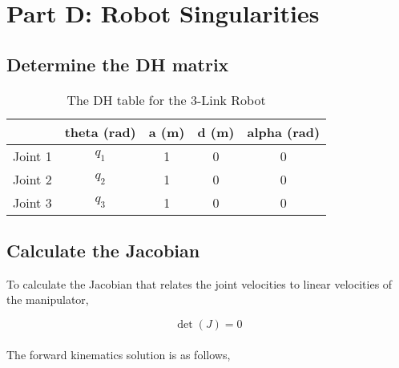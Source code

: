 \section{Part D: Robot Singularities}
\subsection{Determine the DH matrix}
\begin{table}[H]
    \centering
    \begin{tabular}{|c|c|c|c|c|}
        \hline
                & \textbf{theta (rad)} & \textbf{a (m)} & \textbf{d (m)} & \textbf{alpha (rad)} \\ \hline
        Joint 1 & $q_{1}$              & 1              & 0              & 0                    \\ \hline
        Joint 2 & $q_{2}$              & 1              & 0              & 0                    \\ \hline
        Joint 3 & $q_{3}$              & 1              & 0              & 0                    \\ \hline
    \end{tabular}
    \caption{The DH table for the 3-Link Robot}
    \label{table:3-Link Robot}
\end{table}
\subsection{Calculate the Jacobian}

To calculate the Jacobian that relates the joint velocities to linear velocities of the manipulator,

\begin{equation*}
    \det(J) = 0
\end{equation*}
\\
The forward kinematics solution is as follows,

